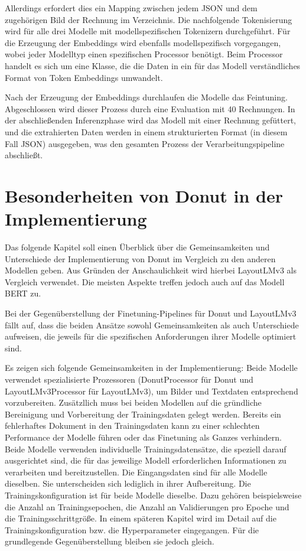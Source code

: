 Allerdings erfordert dies ein Mapping zwischen jedem JSON und dem zugehörigen Bild der Rechnung im Verzeichnis. Die nachfolgende Tokenisierung wird für alle drei Modelle mit modellspezifischen Tokenizern durchgeführt. Für die Erzeugung der Embeddings wird ebenfalls modellspezifisch vorgegangen, wobei jeder Modelltyp einen spezifischen Processor benötigt. Beim Processor handelt es sich um eine Klasse, die die Daten in ein für das Modell verständliches Format von Token Embeddings umwandelt.

Nach der Erzeugung der Embeddings durchlaufen die Modelle das Feintuning. Abgeschlossen wird dieser Prozess durch eine Evaluation mit 40 Rechnungen. In der abschließenden Inferenzphase wird das Modell mit einer Rechnung gefüttert, und die extrahierten Daten werden in einem strukturierten Format (in diesem Fall JSON) ausgegeben, was den gesamten Prozess der Verarbeitungspipeline abschließt.

\section{Besonderheiten von Donut in der Implementierung}
Das folgende Kapitel soll einen Überblick über die Gemeinsamkeiten und Unterschiede der Implementierung von Donut im Vergleich zu den anderen Modellen geben. Aus Gründen der Anschaulichkeit wird hierbei LayoutLMv3 als Vergleich verwendet. Die meisten Aspekte treffen jedoch auch auf das Modell BERT zu.

Bei der Gegenüberstellung der Finetuning-Pipelines für Donut und LayoutLMv3 fällt auf, dass die beiden Ansätze sowohl Gemeinsamkeiten als auch Unterschiede aufweisen, die jeweils für die spezifischen Anforderungen ihrer Modelle optimiert sind.

Es zeigen sich folgende Gemeinsamkeiten in der Implementierung: Beide Modelle verwendet spezialisierte Prozessoren (DonutProcessor für Donut und LayoutLMv3Processor für LayoutLMv3), um Bilder und Textdaten entsprechend vorzubereiten. Zusätzllich muss bei beiden Modellen auf die gründliche Bereinigung und Vorbereitung der Trainingsdaten gelegt werden. Bereits ein fehlerhaftes Dokument in den Trainingsdaten kann zu einer schlechten Performance der Modelle führen oder das Finetuning als Ganzes verhindern. Beide Modelle verwenden individuelle Trainingsdatensätze, die speziell darauf ausgerichtet sind, die für das jeweilige Modell erforderlichen Informationen zu verarbeiten und bereitzustellen. Die Eingangsdaten sind für alle Modelle dieselben. Sie unterscheiden sich lediglich in ihrer Aufbereitung. Die Trainingskonfiguration ist für beide Modelle dieselbe. Dazu gehören beispielsweise die Anzahl an Trainingsepochen, die Anzahl an Validierungen pro Epoche und die Trainingsschrittgröße. In einem späteren Kapitel wird im Detail auf die Trainingskonfiguration bzw. die Hyperparameter eingegangen. Für die grundlegende Gegenüberstellung bleiben sie jedoch gleich.

